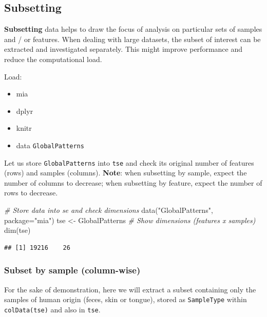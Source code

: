 \documentclass[
]{book}
\newenvironment{Shaded}{\begin{snugshade}}{\end{snugshade}}
\newcommand{\AttributeTok}[1]{\textcolor[rgb]{0.77,0.63,0.00}{#1}}
\newcommand{\CommentTok}[1]{\textcolor[rgb]{0.56,0.35,0.01}{\textit{#1}}}
\newcommand{\FunctionTok}[1]{\textcolor[rgb]{0.00,0.00,0.00}{#1}}
\newcommand{\NormalTok}[1]{#1}
\newcommand{\OtherTok}[1]{\textcolor[rgb]{0.56,0.35,0.01}{#1}}
\newcommand{\StringTok}[1]{\textcolor[rgb]{0.31,0.60,0.02}{#1}}
\providecommand{\tightlist}{%
  \setlength{\itemsep}{0pt}\setlength{\parskip}{0pt}}
\begin{document}
\hypertarget{subsetting}{%
\subsection{Subsetting}\label{subsetting}}

\textbf{Subsetting} data helps to draw the focus of analysis on particular
sets of samples and / or features. When dealing with large datasets,
the subset of interest can be extracted and investigated
separately. This might improve performance and reduce the
computational load.

Load:

\begin{itemize}
\tightlist
\item
  mia
\item
  dplyr
\item
  knitr
\item
  data \texttt{GlobalPatterns}
\end{itemize}

Let us store \texttt{GlobalPatterns} into \texttt{tse} and check its original number of features (rows) and samples (columns). \textbf{Note}: when subsetting by sample, expect the number of columns to decrease; when subsetting by feature, expect the number of rows to decrease.

\begin{Shaded}
\begin{Highlighting}[]
\CommentTok{\# Store data into se and check dimensions}
\FunctionTok{data}\NormalTok{(}\StringTok{"GlobalPatterns"}\NormalTok{, }\AttributeTok{package=}\StringTok{"mia"}\NormalTok{)}
\NormalTok{tse }\OtherTok{\textless{}{-}}\NormalTok{ GlobalPatterns}
\CommentTok{\# Show dimensions (features x samples)}
\FunctionTok{dim}\NormalTok{(tse) }
\end{Highlighting}
\end{Shaded}

\begin{verbatim}
## [1] 19216    26
\end{verbatim}

\hypertarget{subset-by-sample-column-wise}{%
\subsubsection{Subset by sample (column-wise)}\label{subset-by-sample-column-wise}}

For the sake of demonstration, here we will extract a subset containing only the samples of human origin (feces, skin or tongue), stored as \texttt{SampleType} within \texttt{colData(tse)} and also in \texttt{tse}.
\end{document}
